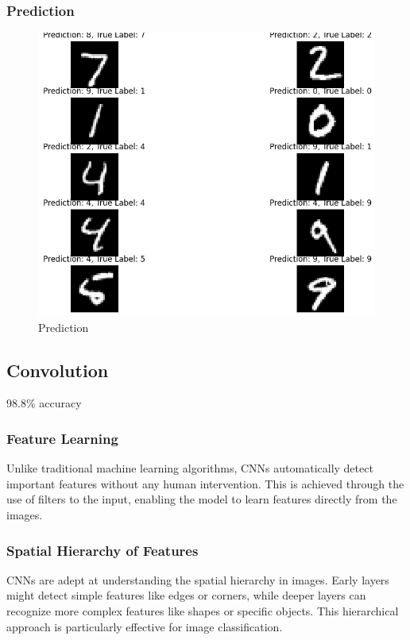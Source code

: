 \documentclass[utf8,1pt]{extarticle} %
\begin{document}
\subsubsection{Prediction}
\begin{figure}
    \centering
    \includegraphics[width=\textwidth]{media/prediction/4.png}
    \caption{Prediction}
    \label{fig:Prediction}
\end{figure}
\subsection{Convolution}
98.8\% accuracy
\subsubsection{Feature Learning}
Unlike traditional machine learning algorithms,
CNNs automatically detect important features without
 any human intervention. 
 This is achieved through the use of filters to the input, 
 enabling the model to learn features directly 
 from the images.

\subsubsection{Spatial Hierarchy of Features}
CNNs are adept at understanding the spatial hierarchy 
in images. 
Early layers might detect simple features like edges or corners,
 while deeper layers can recognize more complex features 
 like shapes or specific objects. 
This hierarchical approach is particularly effective for
image classification.
\end{document}
